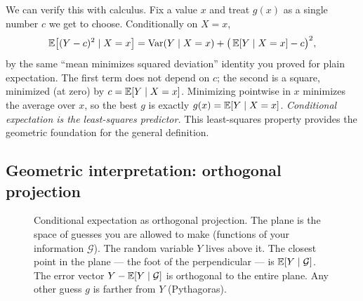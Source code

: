 We can verify this with calculus. Fix a value $x$ and treat
$g(x)$ as a single number $c$ we get to choose. Conditionally on $X = x$,
\[
  \operatorname{\mathbb{E}}\!\big[(Y - c)^2 \mid X = x\big] = \operatorname{Var}(Y \mid X = x) + \big(\operatorname{\mathbb{E}}[Y \mid X = x] - c\big)^2,
\]
by the same ``mean minimizes squared deviation'' identity you proved for plain expectation. The first
term does not depend on $c$; the second is a square, minimized (at zero) by $c = \operatorname{\mathbb{E}}[Y \mid X = x]$.
Minimizing pointwise in $x$ minimizes the average over $x$, so the best $g$ is exactly $g(x) =
\operatorname{\mathbb{E}}[Y \mid X = x]$. \emph{Conditional expectation is the least-squares predictor.}
This least-squares property provides the geometric foundation for the general definition.

\subsection{Geometric interpretation: orthogonal projection}
\label{ch38:projection-picture}

\begin{figure}[H]
\centering
{}
\caption{Conditional expectation as orthogonal projection. The plane is the space of guesses you are
allowed to make (functions of your information $\mathcal{G}$). The random variable $Y$ lives above it.
The closest point in the plane --- the foot of the perpendicular --- is $\operatorname{\mathbb{E}}[Y \mid \mathcal{G}]$.
The error vector $Y - \operatorname{\mathbb{E}}[Y \mid \mathcal{G}]$ is orthogonal to the entire plane. Any other guess
$g$ is farther from $Y$ (Pythagoras).}
\label{ch38:fig-projection}
\end{figure}

